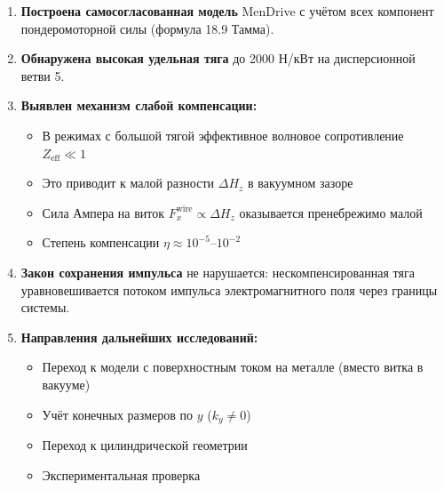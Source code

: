 \documentclass[a4paper,12pt]{article}
\begin{document}
\begin{enumerate}
    \item \textbf{Построена самосогласованная модель} MenDrive с учётом всех
    компонент пондеромоторной силы (формула 18.9 Тамма).

    \item \textbf{Обнаружена высокая удельная тяга} до 2000 Н/кВт на
    дисперсионной ветви 5.

    \item \textbf{Выявлен механизм слабой компенсации:}
    \begin{itemize}
        \item В режимах с большой тягой эффективное волновое сопротивление
        $Z_{\text{eff}} \ll 1$
        \item Это приводит к малой разности $\Delta H_z$ в вакуумном зазоре
        \item Сила Ампера на виток $F_x^{\text{wire}} \propto \Delta H_z$
        оказывается пренебрежимо малой
        \item Степень компенсации $\eta \approx 10^{-5}$--$10^{-2}$
    \end{itemize}

    \item \textbf{Закон сохранения импульса} не нарушается: нескомпенсированная
    тяга уравновешивается потоком импульса электромагнитного поля через границы
    системы.

    \item \textbf{Направления дальнейших исследований:}
    \begin{itemize}
        \item Переход к модели с поверхностным током на металле (вместо витка
        в вакууме)
        \item Учёт конечных размеров по $y$ ($k_y \neq 0$)
        \item Переход к цилиндрической геометрии
        \item Экспериментальная проверка
    \end{itemize}
\end{enumerate}
\end{document}
